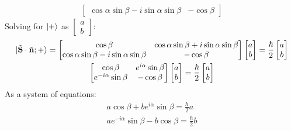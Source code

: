 \documentclass[12pt]{article}
\newcommand{\op}[1]{\tilde{\mathbf{#1}}}
\begin{document}
\begin{enumerate}
\begin{gather*}
\begin{bmatrix}
                \cos\alpha\sin\beta-i\sin\alpha\sin\beta & -\cos\beta
            \end{bmatrix}
        \end{gather*}
        Solving for $\ket{+}$ as $\begin{bmatrix}
                                      a \\
                                      b
        \end{bmatrix}$:
        \begin{gather*}
            \ket{\op{S}\cdot\op{n};+}=
            \begin{bmatrix}
                \cos\beta                                & \cos\alpha\sin\beta      +i\sin\alpha\sin\beta \\
                \cos\alpha\sin\beta-i\sin\alpha\sin\beta & -\cos\beta
            \end{bmatrix}
            \begin{bmatrix}
                a \\
                b
            \end{bmatrix}
            =
            \frac{\hbar}{2}
            \begin{bmatrix}
                a \\
                b
            \end{bmatrix}\\
            \begin{bmatrix}
                \cos\beta             & e^{i\alpha}\sin\beta \\
                e^{-i\alpha}\sin\beta & -\cos\beta
            \end{bmatrix}
            \begin{bmatrix}
                a \\
                b
            \end{bmatrix}
            =
            \frac{\hbar}{2}
            \begin{bmatrix}
                a \\
                b
            \end{bmatrix}\\
        \end{gather*}
        As a system of equations:
        \begin{gather*}
            a\cos\beta+be^{i\alpha}\sin\beta=\frac{\hbar}{2}a\\
            ae^{-i\alpha}\sin\beta  -b\cos\beta=\frac{\hbar}{2}b
        \end{gather*}

\end{enumerate}
\end{document}
